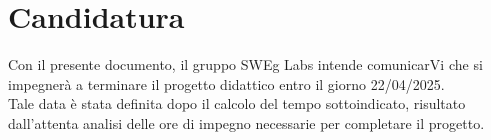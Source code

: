\section{Candidatura}

Con il presente documento, il gruppo SWEg Labs intende comunicarVi che si impegnerà a terminare il progetto didattico entro il giorno 22/04/2025.\\
Tale data è stata definita dopo il calcolo del tempo sottoindicato, risultato dall’attenta analisi delle ore di impegno necessarie per completare il progetto.